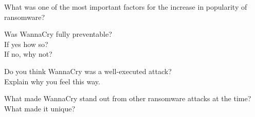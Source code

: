 \begin{question}[Answer]
    \vspace{3cm}
\end{question}


\begin{question}[Question]
    What was one of the most important factors for the increase in popularity of ransomware?
\end{question}

\begin{question}[Answer]
    \vspace{3cm}
\end{question}


\begin{question}[Question]
    
    Was WannaCry fully preventable?\\
    If yes how so?\\
    If no, why not?\\

\end{question}

\begin{question}[Answer]
    \vspace{3cm}
\end{question}

\begin{question}[Answer]
    \vspace{3cm}
\end{question}

\begin{question}[Question]
    
    Do you think WannaCry was a well-executed attack?\\
    Explain why you feel this way.

\end{question}

\begin{question}[Answer]
    \vspace{3cm}
\end{question}

\begin{question}[Question]
    
    What made WannaCry stand out from other ransomware attacks at the time?\\
    What made it unique?

\end{question}

\begin{question}[Answer]
    \vspace{3cm}
\end{question}